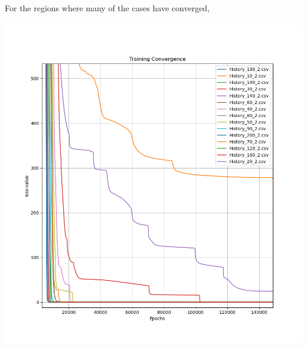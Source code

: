 \documentclass[a4paper, 12pt]{report}
\def\size{0.75}
\begin{document}
\begin{center}
\newpage
For the regions where many of the cases have converged,
\\~\\\includegraphics[scale=\size]{Depth_2_Down.png}
\newpage

\end{center}
\end{document}
